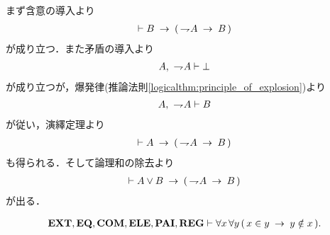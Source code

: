 	\begin{sketch}
		まず含意の導入より
		\begin{align}
			\vdash B \rarrow (\, \negation A \rarrow B\, )
		\end{align}
		が成り立つ．また矛盾の導入より
		\begin{align}
			A,\ \negation A \vdash \bot
		\end{align}
		が成り立つが，爆発律(推論法則\ref{logicalthm:principle_of_explosion})より
		\begin{align}
			A,\ \negation A \vdash B
		\end{align}
		が従い，演繹定理より
		\begin{align}
			\vdash A \rarrow (\, \negation A \rarrow B\, )
		\end{align}
		も得られる．そして論理和の除去より
		\begin{align}
			\vdash A \vee B \rarrow (\, \negation A \rarrow B\, )
		\end{align}
		が出る．
		\QED
	\end{sketch}
	
	\begin{screen}
		\begin{thm}[集合のどの二組も所属関係で堂々巡りしない]
		\label{thm:no_pair_of_sets_go_round}
			\begin{align}
				\EXTAX,\EQAX,\COMAX,\ELEAX,\PAIAX,\REGAX \vdash 
				\forall x\, \forall y\, (\, x \in y \rarrow y \notin x\, ).
			\end{align}
		\end{thm}
	\end{screen}
	
